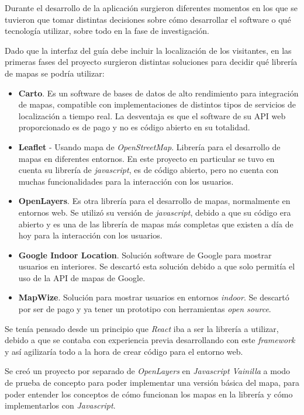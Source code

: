 Durante el desarrollo de la aplicación surgieron diferentes momentos en los que se tuvieron que tomar distintas decisiones sobre cómo desarrollar el software o qué tecnología utilizar, sobre todo en la fase de investigación.

Dado que la interfaz del guía debe incluir la localización de los visitantes, en las primeras fases del proyecto surgieron distintas soluciones para decidir qué librería de mapas se podría utilizar:

\begin{itemize}
    \item \textbf{Carto}. Es un software de bases de datos de alto rendimiento para integración de mapas, compatible con implementaciones de distintos tipos de servicios de localización a tiempo real. La desventaja es que el software de su API web proporcionado es de pago y no es código abierto en su totalidad.
    \item \textbf{Leaflet} - Usando mapa de \textit{OpenStreetMap}. Librería para el desarrollo de mapas en diferentes entornos. En este proyecto en particular se tuvo en cuenta su librería de \textit{javascript}, es de código abierto, pero no cuenta con muchas funcionalidades para la interacción con los usuarios.
    \item \textbf{OpenLayers}. Es otra librería para el desarrollo de mapas, normalmente en entornos web. Se utilizó su versión de \textit{javascript}, debido a que su código era abierto y es una de las librería de mapas más completas que existen a día de hoy para la interacción con los usuarios. 
    \item \textbf{Google Indoor Location}. Solución software de Google para mostrar usuarios en interiores. Se descartó esta solución debido a que solo permitía el uso de la API de mapas de Google.
    \item \textbf{MapWize}. Solución para mostrar usuarios en entornos \textit{indoor}. Se descartó por ser de pago y ya tener un prototipo con herramientas \textit{open source}.
\end{itemize}

Se tenía pensado desde un principio que \textit{React} iba a ser la librería a utilizar,
debido a que se contaba con experiencia previa desarrollando con este \textit{framework} y 
así agilizaría todo a la hora de crear código para el entorno web.

Se creó un proyecto por separado de \textit{OpenLayers} en \textit{Javascript Vainilla} a modo de prueba de concepto para poder implementar una versión básica del mapa, para poder entender los conceptos de cómo funcionan los mapas en la librería y cómo implementarlos con \textit{Javascript}.

